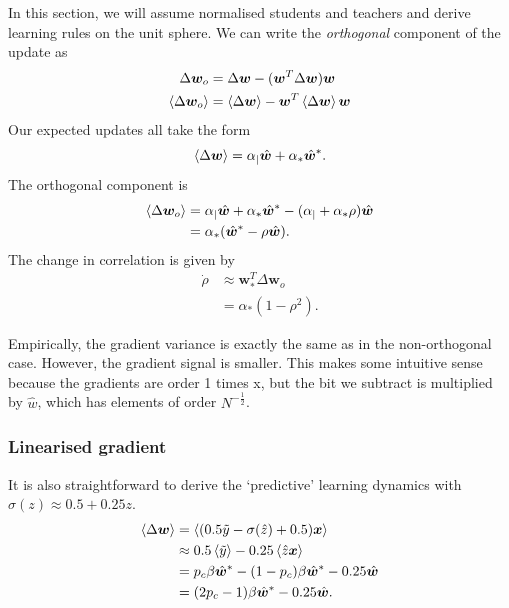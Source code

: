 \documentclass{article}
\renewcommand\b\bm
\begin{document}
In this section, we will assume normalised students and teachers and derive learning rules on the unit sphere.
We can write the \emph{orthogonal} component of the update as
\begin{align}
    \Delta \b{w}_o &= \Delta \b{w} - (\b{w}^T \Delta \b{w}) \b{w}\\
    \braket{\Delta \b{w}_o} &= \braket{\Delta \b{w}} - \b{w}^T \braket{\Delta \b{w}} \b{w}
\end{align}
Our expected updates all take the form
\begin{equation}
    \braket{\Delta \b{w}} = \alpha_{|} \hat{\b{w}} + \alpha_{*} \hat{\b{w}}^*.
\end{equation}
The orthogonal component is
\begin{align}
    \braket{\Delta \b{w}_o} &= \alpha_{|} \hat{\b{w}} + \alpha_{*} \hat{\b{w}}^* - (\alpha_{|} + \alpha_{*} \rho) \hat{\b{w}}\\
    &= \alpha_{*} (\hat{\b{w}}^* - \rho \hat{\b{w}}).
\end{align}
The change in correlation is given by
\begin{align}
    \dot{\rho} &\approx \b{w}_*^T \Delta \b{w}_o\\
    &= \alpha_{*} (1 - \rho^2).
\end{align}

Empirically, the gradient variance is exactly the same as in the non-orthogonal case.
However, the gradient signal is smaller.
This makes some intuitive sense because the gradients are order 1 times x, but the bit we subtract is multiplied by $\hat{w}$, which has elements of order $N^{-\frac12}$.

\newpage






\subsubsection*{Linearised gradient}

It is also straightforward to derive the `predictive' learning dynamics with $\sigma (z) \approx 0.5 + 0.25 z$.
\begin{align}
    \braket{ \Delta \b{w}} &= \braket{(0.5 \tilde{y} -\sigma(\hat{z}) + 0.5) \b{x}}\\
    &\approx 0.5 \braket{\tilde{y}} - 0.25 \braket{\hat{z} \b{x}}\\
    &= p_c \beta \hat{\b{w}}^* - (1-p_c)\beta \hat{\b{w}}^* - 0.25 \hat{\b{w}}\\
    &= (2 p_c - 1) \beta \hat{\b{w}}^* - 0.25 \hat{\b{w}}.
\end{align}
\end{document}
